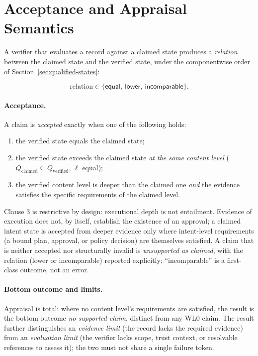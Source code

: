 \documentclass[11pt]{article}
\begin{document}
\section{Acceptance and Appraisal Semantics}
\label{sec:acceptance}

A verifier that evaluates a record against a claimed state produces a \emph{relation} between the claimed state and the verified state, under the componentwise order of Section~\ref{sec:qualified-states}:

\[
\mathrm{relation} \in \{\textsf{equal},\ \textsf{lower},\ \textsf{incomparable}\}.
\]

\paragraph{Acceptance.} A claim is \emph{accepted} exactly when one of the following holds:
\begin{enumerate}[leftmargin=*]
\item the verified state equals the claimed state;
\item the verified state exceeds the claimed state \emph{at the same content level} ($Q_{\mathrm{claimed}} \subseteq Q_{\mathrm{verified}}$, $\ell$ equal);
\item the verified content level is deeper than the claimed one \emph{and} the evidence satisfies the specific requirements of the claimed level.
\end{enumerate}
Clause 3 is restrictive by design: executional depth is not entailment. Evidence of execution does not, by itself, establish the existence of an approval; a claimed intent state is accepted from deeper evidence only where intent-level requirements (a bound plan, approval, or policy decision) are themselves satisfied. A claim that is neither accepted nor structurally invalid is \emph{unsupported as claimed}, with the relation (\textsf{lower} or \textsf{incomparable}) reported explicitly; ``incomparable'' is a first-class outcome, not an error.

\paragraph{Bottom outcome and limits.} Appraisal is total: where no content level's requirements are satisfied, the result is the bottom outcome \emph{no supported claim}, distinct from any WL0 claim. The result further distinguishes an \emph{evidence limit} (the record lacks the required evidence) from an \emph{evaluation limit} (the verifier lacks scope, trust context, or resolvable references to assess it); the two must not share a single failure token.
\end{document}
